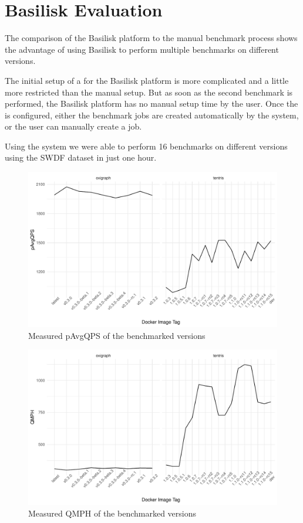 \section{Basilisk Evaluation}
The comparison of the Basilisk platform to the manual benchmark process shows the advantage of using Basilisk to perform multiple benchmarks on different \ts{} versions.

The initial setup of a \ts{} for the Basilisk platform is more complicated and a little more restricted than the manual setup.
But as soon as the second benchmark is performed, the Basilisk platform has no manual setup time by the user.
Once the \ts{} is configured, either the benchmark jobs are created automatically by the system, or the user can manually create a job.

Using the system we were able to perform 16 benchmarks on different \tentris{} versions using the SWDF dataset in just one hour.

\begin{figure}[tbph]
	\centering
	\includegraphics[width=.8\textwidth]{figures/pAvgQPS.pdf}
	\caption{Measured pAvgQPS of the benchmarked \ts{} versions}
	\label{fig:pAvgQPS}
\end{figure}

\begin{figure}[tbph]
	\centering
	\includegraphics[width=.8\textwidth]{figures/QMPH.pdf}
	\caption{Measured QMPH of the benchmarked \ts{} versions}
	\label{fig:QMPH}
\end{figure}



